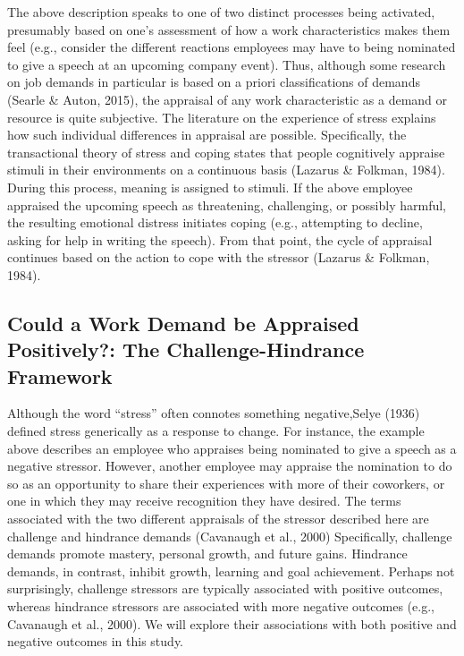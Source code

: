 \documentclass[
  man]{apa6}
\begin{document}
The above description speaks to one of two distinct processes being activated, presumably based on one's assessment of how a work characteristics makes them feel (e.g., consider the different reactions employees may have to being nominated to give a speech at an upcoming company event). Thus, although some research on job demands in particular is based on a priori classifications of demands (Searle \& Auton, 2015), the appraisal of any work characteristic as a demand or resource is quite subjective. The literature on the experience of stress explains how such individual differences in appraisal are possible. Specifically, the transactional theory of stress and coping states that people cognitively appraise stimuli in their environments on a continuous basis (Lazarus \& Folkman, 1984). During this process, meaning is assigned to stimuli. If the above employee appraised the upcoming speech as threatening, challenging, or possibly harmful, the resulting emotional distress initiates coping (e.g., attempting to decline, asking for help in writing the speech). From that point, the cycle of appraisal continues based on the action to cope with the stressor (Lazarus \& Folkman, 1984).

\hypertarget{could-a-work-demand-be-appraised-positively-the-challenge-hindrance-framework}{%
\subsection{Could a Work Demand be Appraised Positively?: The Challenge-Hindrance Framework}\label{could-a-work-demand-be-appraised-positively-the-challenge-hindrance-framework}}

Although the word ``stress'' often connotes something negative,Selye (1936) defined stress generically as a response to change. For instance, the example above describes an employee who appraises being nominated to give a speech as a negative stressor. However, another employee may appraise the nomination to do so as an opportunity to share their experiences with more of their coworkers, or one in which they may receive recognition they have desired. The terms associated with the two different appraisals of the stressor described here are challenge and hindrance demands (Cavanaugh et al., 2000) Specifically, challenge demands promote mastery, personal growth, and future gains. Hindrance demands, in contrast, inhibit growth, learning and goal achievement. Perhaps not surprisingly, challenge stressors are typically associated with positive outcomes, whereas hindrance stressors are associated with more negative outcomes (e.g., Cavanaugh et al., 2000). We will explore their associations with both positive and negative outcomes in this study.
\end{document}
